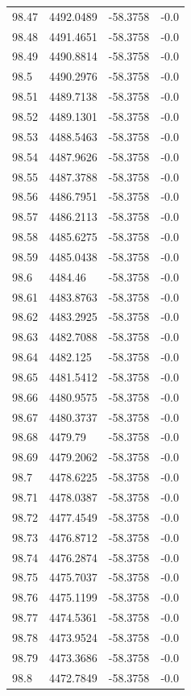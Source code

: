 \begin{table}[H]
\begin{tabular}{llll}
98.47 & 4492.0489 & -58.3758 & -0.0 \\
98.48 & 4491.4651 & -58.3758 & -0.0 \\
98.49 & 4490.8814 & -58.3758 & -0.0 \\
98.5 & 4490.2976 & -58.3758 & -0.0 \\
98.51 & 4489.7138 & -58.3758 & -0.0 \\
98.52 & 4489.1301 & -58.3758 & -0.0 \\
98.53 & 4488.5463 & -58.3758 & -0.0 \\
98.54 & 4487.9626 & -58.3758 & -0.0 \\
98.55 & 4487.3788 & -58.3758 & -0.0 \\
98.56 & 4486.7951 & -58.3758 & -0.0 \\
98.57 & 4486.2113 & -58.3758 & -0.0 \\
98.58 & 4485.6275 & -58.3758 & -0.0 \\
98.59 & 4485.0438 & -58.3758 & -0.0 \\
98.6 & 4484.46 & -58.3758 & -0.0 \\
98.61 & 4483.8763 & -58.3758 & -0.0 \\
98.62 & 4483.2925 & -58.3758 & -0.0 \\
98.63 & 4482.7088 & -58.3758 & -0.0 \\
98.64 & 4482.125 & -58.3758 & -0.0 \\
98.65 & 4481.5412 & -58.3758 & -0.0 \\
98.66 & 4480.9575 & -58.3758 & -0.0 \\
98.67 & 4480.3737 & -58.3758 & -0.0 \\
98.68 & 4479.79 & -58.3758 & -0.0 \\
98.69 & 4479.2062 & -58.3758 & -0.0 \\
98.7 & 4478.6225 & -58.3758 & -0.0 \\
98.71 & 4478.0387 & -58.3758 & -0.0 \\
98.72 & 4477.4549 & -58.3758 & -0.0 \\
98.73 & 4476.8712 & -58.3758 & -0.0 \\
98.74 & 4476.2874 & -58.3758 & -0.0 \\
98.75 & 4475.7037 & -58.3758 & -0.0 \\
98.76 & 4475.1199 & -58.3758 & -0.0 \\
98.77 & 4474.5361 & -58.3758 & -0.0 \\
98.78 & 4473.9524 & -58.3758 & -0.0 \\
98.79 & 4473.3686 & -58.3758 & -0.0 \\
98.8 & 4472.7849 & -58.3758 & -0.0 \\

\end{tabular}
\end{table}
